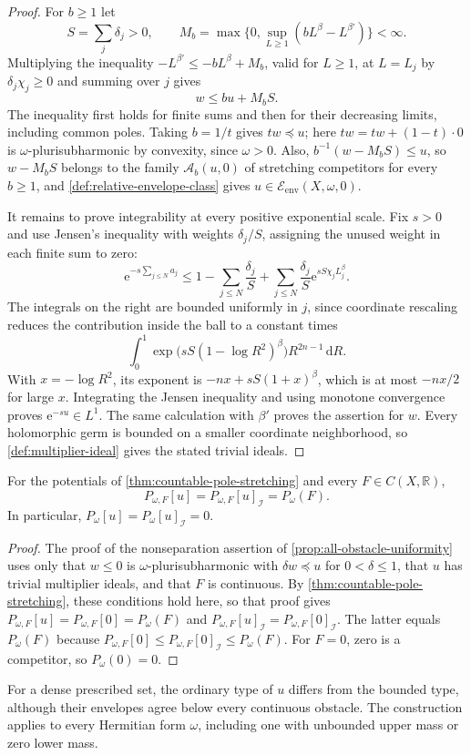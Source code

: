 \begin{proof}
For $b\geq1$ let
\[
 S=\sum_j\delta_j>0,\qquad
 M_b=\max\{0,\sup_{L\geq1}(bL^\beta-L^{\beta'})\}<\infty.
\]
Multiplying the inequality $-L^{\beta'}\leq-bL^\beta+M_b$, valid for $L\geq1$, at $L=L_j$ by $\delta_j\chi_j\geq0$ and summing over $j$ gives
\begin{equation}\label{eq:countable-fixed-minorant}
 w\leq bu+M_bS.
\end{equation}
The inequality first holds for finite sums and then for their decreasing limits, including common poles. Taking $b=1/t$ gives $tw\preceq u$; here $tw=tw+(1-t)\cdot0$ is $\omega$-plurisubharmonic by convexity, since $\omega>0$. Also, $b^{-1}(w-M_bS)\leq u$, so $w-M_bS$ belongs to the family $\mathcal A_b(u,0)$ of stretching competitors for every $b\geq1$, and \cref{def:relative-envelope-class} gives $u\in\mathcal E_{\mathrm{env}}(X,\omega,0)$.

It remains to prove integrability at every positive exponential scale. Fix $s>0$ and use Jensen's inequality with weights $\delta_j/S$, assigning the unused weight in each finite sum to zero:
\[
 \mathrm e^{-s\sum_{j\leq N}a_j}
 \leq1-\sum_{j\leq N}\frac{\delta_j}{S}
     +\sum_{j\leq N}\frac{\delta_j}{S}
          \mathrm e^{sS\chi_jL_j^\beta}.
\]
The integrals on the right are bounded uniformly in $j$, since coordinate rescaling reduces the contribution inside the ball to a constant times
\[
 \int_0^1\exp\bigl(sS(1-\log R^2)^\beta\bigr)R^{2n-1}\,\mathrm dR.
\]
With $x=-\log R^2$, its exponent is $-nx+sS(1+x)^\beta$, which is at most $-nx/2$ for large $x$. Integrating the Jensen inequality and using monotone convergence proves $\mathrm e^{-su}\in L^1$. The same calculation with $\beta'$ proves the assertion for $w$. Every holomorphic germ is bounded on a smaller coordinate neighborhood, so \cref{def:multiplier-ideal} gives the stated trivial ideals.
\end{proof}

\begin{proposition}\label{prop:countable-pole-all-obstacles}
For the potentials of \cref{thm:countable-pole-stretching} and every $F\in C(X,\mathbb R)$,
\[
 P_{\omega,F}[u]=P_{\omega,F}[u]_{\mathcal I}=P_\omega(F).
\]
In particular, $P_\omega[u]=P_\omega[u]_{\mathcal I}=0$.
\end{proposition}
\begin{proof}
The proof of the nonseparation assertion of \cref{prop:all-obstacle-uniformity} uses only that $w\leq0$ is $\omega$-plurisubharmonic with $\delta w\preceq u$ for $0<\delta\leq1$, that $u$ has trivial multiplier ideals, and that $F$ is continuous. By \cref{thm:countable-pole-stretching}, these conditions hold here, so that proof gives $P_{\omega,F}[u]=P_{\omega,F}[0]=P_\omega(F)$ and $P_{\omega,F}[u]_{\mathcal I}=P_{\omega,F}[0]_{\mathcal I}$. The latter equals $P_\omega(F)$ because $P_{\omega,F}[0]\leq P_{\omega,F}[0]_{\mathcal I}\leq P_\omega(F)$. For $F=0$, zero is a competitor, so $P_\omega(0)=0$.
\end{proof}

For a dense prescribed set, the ordinary type of $u$ differs from the bounded type, although their envelopes agree below every continuous obstacle. The construction applies to every Hermitian form $\omega$, including one with unbounded upper mass or zero lower mass.
